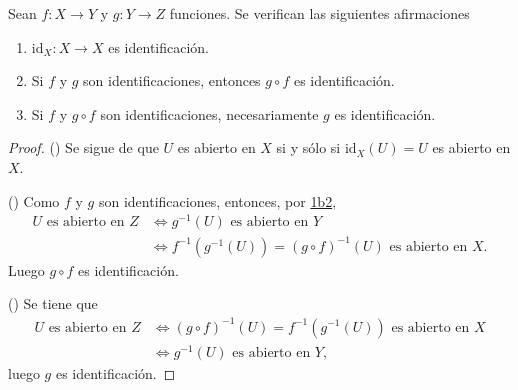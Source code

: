 

\begin{proposition}
Sean $f : X \longrightarrow Y$ y $g : Y \longrightarrow Z$ funciones. Se verifican las siguientes afirmaciones
\begin{enumerate}[label=\textnormal{(\roman*)}]
\item $\text{id}_X : X \longrightarrow X$ es identificación.
\item Si $f$ y $g$ son identificaciones, entonces $g \circ f$ es identificación.
\item Si $f$ y $g \circ f$ son identificaciones, necesariamente $g$ es identificación.
\end{enumerate}
\end{proposition}

\begin{proof}
({\scshape{}}) Se sigue de que $U$ es abierto en $X$ si y sólo si $\text{id}_X(U) = U$ es abierto en $X$.
\bigskip

({\scshape{}}) Como $f$ y $g$ son identificaciones, entonces, por \hyperref[card:1b2]{\textsf{1b2}},
\begin{align*}
    U \text{ es abierto en } Z & \iff g^{-1}(U) \text{ es abierto en } Y \\
                               & \iff f^{-1}(g^{-1}(U)) = (g \circ f)^{-1}(U) \text{ es abierto en } X.
\end{align*}
Luego $g \circ f$ es identificación.
\bigskip

({\scshape{}}) Se tiene que
\begin{align*}
    U \text{ es abierto en } Z & \iff (g \circ f)^{-1}(U) = f^{-1}(g^{-1}(U)) \text{ es abierto en } X \\
                               & \iff g^{-1}(U) \text{ es abierto en } Y,
\end{align*}
luego $g$ es identificación.
\end{proof}
